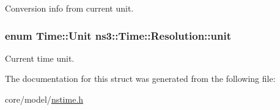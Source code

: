 Conversion info from current unit. 

\subsubsection[{\texorpdfstring{unit}{unit}}]{\setlength{\rightskip}{0pt plus 5cm}enum {\bf Time\+::\+Unit} ns3\+::\+Time\+::\+Resolution\+::unit}\hypertarget{structns3_1_1Time_1_1Resolution_a6a95aef10bc5c55186b3b8f587027715}{}\label{structns3_1_1Time_1_1Resolution_a6a95aef10bc5c55186b3b8f587027715}


Current time unit. 



The documentation for this struct was generated from the following file\+:\begin{DoxyCompactItemize}
\item 
core/model/\hyperlink{nstime_8h}{nstime.\+h}\end{DoxyCompactItemize}
